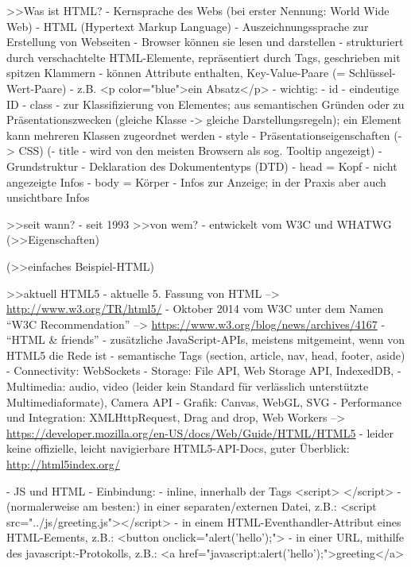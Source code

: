 \documentclass[a4paper, 12pt, hidelinks, listof=totoc, listoftables=totoc, bibliography=totoc]{scrreprt}
\begin{document}
>>Was ist HTML?
	- Kernsprache des Webs (bei erster Nennung: World Wide Web)
	- HTML (Hypertext Markup Language)
	- Auszeichnungssprache zur Erstellung von Webseiten
	- Browser können sie lesen und darstellen
	- strukturiert durch verschachtelte HTML-Elemente, repräsentiert durch Tags, geschrieben mit spitzen Klammern
		- können Attribute enthalten, Key-Value-Paare (= Schlüssel-Wert-Paare)
		- z.B. <p color="blue">ein Absatz</p>
		- wichtig:
			- id - eindeutige ID
			- class - zur Klassifizierung von Elementes; aus semantischen Gründen oder zu Präsentationszwecken (gleiche Klasse -> gleiche Darstellungsregeln); ein Element kann mehreren Klassen zugeordnet werden
			- style - Präsentationseigenschaften (-> CSS)
			(- title - wird von den meisten Browsern als sog. Tooltip angezeigt)
	- Grundstruktur
		- Deklaration des Dokumententyps (DTD)
		- head = Kopf - nicht angezeigte Infos
		- body = Körper - Infos zur Anzeige; in der Praxis aber auch unsichtbare Infos
	
>>seit wann?
	- seit 1993
>>von wem?
	- entwickelt vom W3C und WHATWG
(>>Eigenschaften)

(>>einfaches Beispiel-HTML)

>>aktuell HTML5
	- aktuelle 5. Fassung von HTML  -->  \url{http://www.w3.org/TR/html5/}
	- Oktober 2014 vom W3C unter dem Namen "`W3C Recommendation"'  -->  \url{https://www.w3.org/blog/news/archives/4167}
	- "`HTML \& friends"' - zusätzliche JavaScript-APIs, meistens mitgemeint, wenn von HTML5 die Rede ist
		- semantische Tags (section, article, nav, head, footer, aside)
		- Connectivity: WebSockets
		- Storage: File API, Web Storage API, IndexedDB, 
		- Multimedia: audio, video (leider kein Standard für verlässlich unterstützte Multimediaformate), Camera API
		- Grafik: Canvas, WebGL, SVG
		- Performance und Integration: XMLHttpRequest, Drag and drop, Web Workers
	-->  \url{https://developer.mozilla.org/en-US/docs/Web/Guide/HTML/HTML5}
	- leider keine offizielle, leicht navigierbare HTML5-API-Docs, guter Überblick: \url{http://html5index.org/}

- JS und HTML
	- Einbindung:
		- inline, innerhalb der Tags <script> </script>
		- (normalerweise am besten:) in einer separaten/externen Datei, z.B.: <script src="../js/greeting.js"></script>
		- in einem HTML-Eventhandler-Attribut eines HTML-Eements, z.B.: <button onclick="alert('hello');">
		- in einer URL, mithilfe des javascript:-Protokolls, z.B.: <a href="javascript:alert('hello');">greeting</a>
\end{document}
